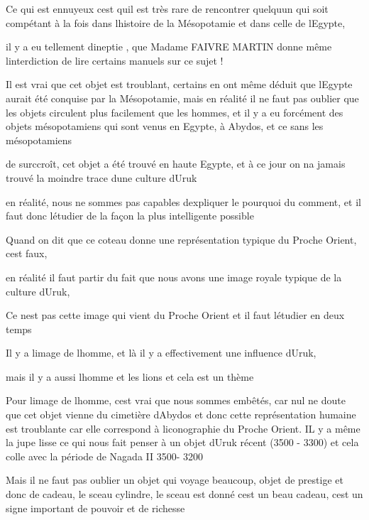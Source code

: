 \documentclass{article}
\begin{document}
Ce qui est ennuyeux c{\textquotesingle}est qu{\textquotesingle}il est
très rare de rencontrer quelqu{\textquotesingle}un qui soit compétant à
la fois dans l{\textquotesingle}histoire de la Mésopotamie et dans
celle de l{\textquotesingle}Egypte, 

il y a eu tellement d{\textquotesingle}ineptie , que Madame FAIVRE
MARTIN donne même l{\textquotesingle}interdiction de lire certains
manuels sur ce sujet !

Il est vrai que cet objet est troublant, certains en ont même déduit que
l{\textquotesingle}Egypte aurait été conquise par la Mésopotamie, mais
en réalité il ne faut pas oublier que les objets circulent plus
facilement que les hommes, et il y a eu forcément des objets
mésopotamiens qui sont venus en Egypte, à Abydos, et ce sans les
mésopotamiens

de surccroît, cet objet a été trouvé en haute Egypte, et à ce jour on
n{\textquotesingle}a jamais trouvé la moindre trace
d{\textquotesingle}une culture d{\textquotesingle}Uruk

en réalité, nous ne sommes pas capables d{\textquotesingle}expliquer le
pourquoi du comment, et il faut donc l{\textquotesingle}étudier de la
façon la plus intelligente possible

Quand on dit que ce coteau donne une représentation typique du Proche
Orient, c{\textquotesingle}est faux, 

en réalité il faut partir du fait que nous avons une image royale
typique de la culture d{\textquotesingle}Uruk, 

Ce n{\textquotesingle}est pas cette image qui vient du Proche Orient et
il faut l{\textquotesingle}étudier en deux temps

Il y a l{\textquotesingle}image de l{\textquotesingle}homme, et là il y
a effectivement une influence d{\textquotesingle}Uruk, 

mais il y a aussi l{\textquotesingle}homme et les lions et cela est un
thème

Pour l{\textquotesingle}image de l{\textquotesingle}homme,
c{\textquotesingle}est vrai que nous sommes embêtés, car nul ne doute
que cet objet vienne du cimetière d{\textquotesingle}Abydos et donc
cette représentation humaine est troublante car elle correspond à
l{\textquotesingle}iconographie du Proche Orient. IL y a même la jupe
lisse ce qui nous fait penser à un objet d{\textquotesingle}Uruk récent
(3500 - 3300) et cela colle avec la période de Nagada II 3500- 3200

Mais il ne faut pas oublier un objet qui voyage beaucoup, objet de
prestige et donc de cadeau, le sceau cylindre, le sceau est donné
c{\textquotesingle}est un beau cadeau, c{\textquotesingle}est un signe
important de pouvoir et de richesse
\end{document}
